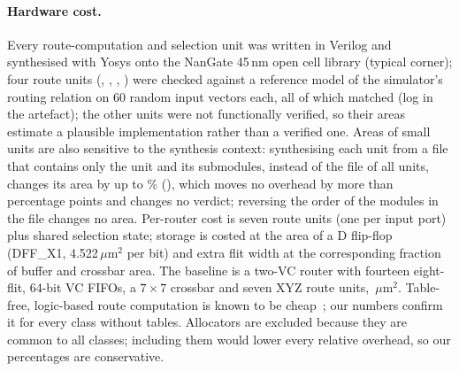 \begin{table}[tbp]
\centering
\caption{Probability that a tier boundary has no healthy vertical link, and standard deviation of the fraction of failed links per boundary, under the Gaussian-copula model. Monte Carlo with $2\times10^6$ samples for $\xi>0$ (a zero count is reported as the 95\% upper bound $3/n$; values resting on fewer than 20 sampled events are given to one significant digit); $\xi=0$ exact.}
\label{tab:partition}
\small

\end{table}

\paragraph{Hardware cost.} Every route-computation and selection unit was written in Verilog and synthesised with Yosys onto the NanGate 45\,nm open cell library (typical corner); four route units (, , , ) were checked against a reference model of the simulator's routing relation on 60 random input vectors each, all of which matched (log in the artefact); the other units were not functionally verified, so their areas estimate a plausible implementation rather than a verified one. Areas of small units are also sensitive to the synthesis context: synthesising each unit from a file that contains only the unit and its submodules, instead of the file of all units, changes its area by up to \% (), which moves no overhead by more than  percentage points and changes no  verdict; reversing the order of the modules in the file changes no area. Per-router cost is seven route units (one per input port) plus shared selection state; storage is costed at the area of a D flip-flop (DFF\_X1, 4.522\,$\mu$m$^2$ per bit) and extra flit width at the corresponding fraction of buffer and crossbar area. The baseline is a two-VC router with fourteen eight-flit, 64-bit VC FIFOs, a $7\times7$ crossbar and seven XYZ route units, \,$\mu$m$^2$. Table-free, logic-based route computation is known to be cheap~\cite{rodrigo2011ulbdr}; our numbers confirm it for every class without tables. Allocators are excluded because they are common to all classes; including them would lower every relative overhead, so our percentages are conservative.

